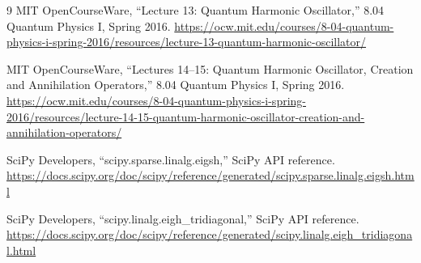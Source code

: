 \documentclass[10pt]{article}
\begin{document}
\begin{thebibliography}{9}
\small
{}
MIT OpenCourseWare, ``Lecture 13: Quantum Harmonic Oscillator,''
8.04 Quantum Physics I, Spring 2016.
\url{https://ocw.mit.edu/courses/8-04-quantum-physics-i-spring-2016/resources/lecture-13-quantum-harmonic-oscillator/}

MIT OpenCourseWare, ``Lectures 14--15: Quantum Harmonic Oscillator,
Creation and Annihilation Operators,'' 8.04 Quantum Physics I, Spring 2016.
\url{https://ocw.mit.edu/courses/8-04-quantum-physics-i-spring-2016/resources/lecture-14-15-quantum-harmonic-oscillator-creation-and-annihilation-operators/}

SciPy Developers, ``scipy.sparse.linalg.eigsh,'' SciPy API reference.
\url{https://docs.scipy.org/doc/scipy/reference/generated/scipy.sparse.linalg.eigsh.html}

SciPy Developers, ``scipy.linalg.eigh\_tridiagonal,'' SciPy API reference.
\url{https://docs.scipy.org/doc/scipy/reference/generated/scipy.linalg.eigh_tridiagonal.html}
\end{thebibliography}
\end{document}
